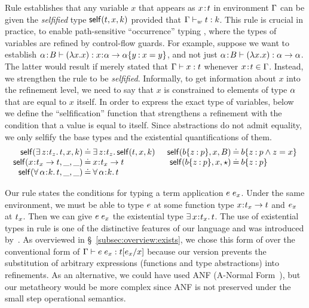 %
Rule \tVar establishes that any variable $x$ that
appears as $\bind{x}{\stype}$ in environment $\tcenv$
can be given the \emph{selfified} type \cite{Ou2004}
$\self{\stype}{x}{\skind}$ provided that
$\isWellFormed{\tcenv}{\stype}{\skind}$.
%
This rule is crucial in practice,
to enable path-sensitive ``occurrence'' typing \cite{Tob08},
where the types of variables are refined by control-flow guards.
%
For example, suppose we want to establish
$\hastype{\bind{\al}{\skbase}}{(\vabs{x}{x})}{\functype{x}{\al}{\breft{\al}{y}{x=y}}}$,
and not just $\hastype{\bind{\al}{\skbase}}{(\vabs{x}{x})}{\funcftype{\al}{\al}}$.
%
The latter would result
if \tVar merely stated that
$\hastype{\tcenv}{x}{\stype}$
whenever $\bind{x}{\stype} \in \tcenv$.
%
Instead, we strengthen the \tVar rule to
be \emph{selfified}.
%
Informally, to get information about $x$
into the refinement level, we need to say
that $x$ is constrained to elements of
type $\al$ that are equal to $x$ itself.
%
In order to express the exact type of
variables, below we define the ``selfification''
function that strengthens a refinement
with the condition that a value is equal
to itself.
%
Since abstractions do not admit equality,
we only selfify the base types and the existential
quantifications of them.
%
$$\begin{array}{r@{\hskip 0.03in}c@{\hskip 0.03in}l@{\hskip 0.2in}r@{\hskip 0.03in}c@{\hskip 0.03in}l}
  \self{\existype{z}{t_z}{t}}{x}{\skind} & \defeq & \existype{z}{t_z}{\self{t}{x}{\skind}} & 
  \self{\breft{\sbase}{z}{p}}{x}{\skbase} & \defeq & \breft{\sbase}{z}{p \wedge z = x} \\
  \self{\functype{x}{t_x}{t}}{\_}{\_} & \defeq & \functype{x}{t_x}{t} &
  \self{\breft{\sbase}{z}{p}}{x}{\skstar} & \defeq & \breft{\sbase}{z}{p} \\ 
  \self{\polytype{\al}{k}{t}}{\_}{\_} & \defeq & \polytype{\al}{k}{t}
\end{array}$$

%
Our rule \tApp states the conditions for typing
a term application $\app{\sexpr}{\sexpr_x}$.
%
Under the same environment,
we must be able to type $\sexpr$ at
some function type $\functype{x}{\stype_x}{\stype}$ and
$\sexpr_x$ at $\stype_x$. Then we can give $\app{\sexpr}{\sexpr_x}$
the existential type $\existype{x}{\stype_x}{\stype}$.
%
The use of existential types in rule \tApp
is one of the distinctive features of our language
and was introduced by~\citet{Knowles09}.
%
As overviewed in \S~\ref{subsec:overview:exists},
we chose this form of \tApp over the conventional
form of $\hastype{\tcenv}{\app{\sexpr}{\sexpr_x}}{\subst{\stype}{x}{\sexpr_x}}$
because our version prevents
the substitution of arbitrary expressions (\eg functions and type abstractions)
into refinements.
%
As an alternative, we could have used ANF (A-Normal Form~\cite{Flanagan93}),
but our metatheory would be more complex
since ANF is not preserved under the small step operational semantics.

